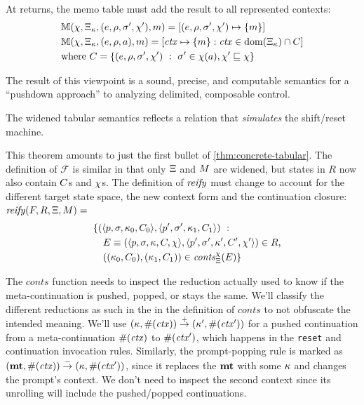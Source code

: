 At returns, the memo table must add the result to all represented contexts:
\newcommand{\res}{m}
\begin{align*}
  &\memoize(\mmktab, \mktab_\mkont, (\mexpr,\menv, \mstore', \mmktab'), \res) =
  [(\mexpr,\menv, \mstore',\mmktab') \mapsto \set{{\res}}] \\
  &\memoize(\mmktab, \mktab_\mkont, (\mexpr,\menv, \maddr), \res) = [\mctx \mapsto \set{\res} : \mctx \in \dom(\mktab_\mkont) \cap C] \\
  &\text{where } C = \setbuild{(\mexpr,\menv, \mstore', \mmktab')}{\mstore' \in \mmktab(\maddr), \mmktab' \sqsubseteq \mmktab}
\end{align*}

The result of this viewpoint is a sound, precise, and computable semantics for a ``pushdown approach'' to analyzing delimited, composable control.

\begin{theorem}\label{thm:sound-sr}
  The widened tabular semantics reflects a relation that \emph{simulates} the shift/reset machine.
\end{theorem}

This theorem amounts to just the first bullet of \autoref{thm:concrete-tabular}.
%
The definition of ${\mathcal F}$ is similar in that only $\Xi$ and $M$ are widened, but states in $R$ now also contain $C$s and $\chi$s.
%
The definition of $\mathit{reify}$ must change to account for the different target state space, the new context form and the continuation closure:
\\

  $\mathit{reify}(F, R, \Xi, M) =$
\begin{align*}
  &\quad \{ (\tpl{\mpoint,\mstore,\mkont_0,\mmkont_0},
              \tpl{\mpoint',\mstore',\mkont_1,\mmkont_1})\ :\ 
\\ &\qquad E\equiv(\tpl{\mpoint,\mstore,\mkont,\mmkont,\mmktab}, \tpl{\mpoint',\mstore',\mkont',\mmkont',\mmktab'}) \in R\text,
\\ &\qquad((\mkont_0,\mmkont_0),(\mkont_1,\mmkont_1)) \in \mathit{conts}_\mktab^\mmktab(E) \}
\end{align*}

The $\mathit{conts}$ function needs to inspect the reduction actually used to know if the meta-continuation is pushed, popped, or stays the same.
%
We'll classify the different reductions as such in the in the definition of $\mathit{conts}$ to not obfuscate the intended meaning.
%
We'll use $(\kappa,\#(\mathit{ctx})) \overset{+}{\to} (\kappa',\#(\mathit{ctx}'))$ for a pushed continuation from a meta-continuation $\#(\mathit{ctx})$ to $\#(\mathit{ctx}')$, which happens in the \texttt{reset} and continuation invocation rules.
%
Similarly, the prompt-popping rule is marked as $(\mathbf{mt},\#(\mathit{ctx})) \overset{-}{\to} (\kappa,\#(\mathit{ctx}'))$, since it replaces the $\mathbf{mt}$ with some $\kappa$ and changes the prompt's context.
%
We don't need to inspect the second context since its unrolling will include the pushed/popped continuations.

